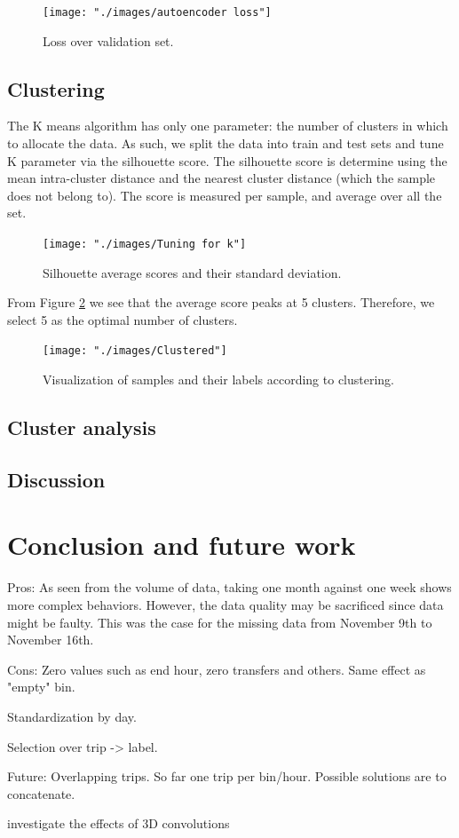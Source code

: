 \documentclass{article}
\begin{document}
\begin{figure}[H]
  \centering
  \texttt{[image: "./images/autoencoder loss"]}
  \caption{Loss over validation set.}
  \label{fig:clustering/loss}
\end{figure}

\subsection{Clustering}
The K means algorithm has only one parameter: the number of clusters in which to allocate the data. As such, we split the data into train and test sets and tune K parameter via the silhouette score. The silhouette score is determine using the mean intra-cluster distance and the nearest cluster distance (which the sample does not belong to). The score is measured per sample, and average over all the set. 

\begin{figure}[H]
  \centering
  \texttt{[image: "./images/Tuning for k"]}
  \caption{Silhouette average scores and their standard deviation.}
  \label{fig:clustering/tuning}
\end{figure}

From Figure \ref{fig:clustering/tuning} we see that the average score peaks at 5 clusters. Therefore, we select 5 as the optimal number of clusters. 

\begin{figure}[H]
  \centering
  \texttt{[image: "./images/Clustered"]}
  \caption{Visualization of samples and their labels according to clustering.}
  \label{fig:clustering/tsne}
\end{figure}

\subsection{Cluster analysis}



\subsection{Discussion}


\newpage
\section{Conclusion and future work}
\label{sec:conclusion}
Pros:
As seen from the volume of data, taking one month against one week shows more complex behaviors. However, the data quality may be sacrificed since data might be faulty. This was the case for the missing data from November 9th to November 16th. 

Cons:
Zero values such as end hour, zero transfers and others. Same effect as "empty" bin. 

Standardization by day.

Selection over trip -> label. 


Future:
Overlapping trips. So far one trip per bin/hour. Possible solutions are to concatenate.

investigate the effects of 3D convolutions

\newpage
{}

\end{document}
